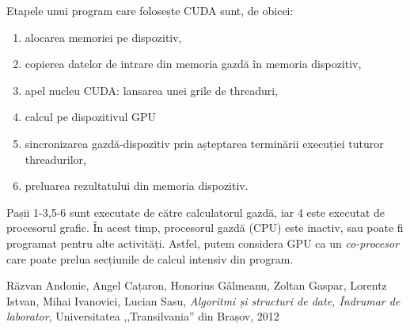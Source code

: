 \documentclass[9pt,a4paper]{article}
\begin{document}
Etapele unui program care folosește CUDA sunt, de obicei:
\begin{enumerate}
    \item alocarea memoriei pe dispozitiv,
    \item copierea datelor de intrare din memoria gazdă în memoria dispozitiv,
    \item apel nucleu CUDA: lansarea unei grile de threaduri,
    \item calcul pe dispozitivul GPU
    \item sincronizarea gazdă-dispozitiv prin așteptarea terminării execuției tuturor threadurilor,
    \item preluarea rezultatului din memoria dispozitiv.
\end{enumerate}

Pașii 1-3,5-6 sunt executate de către calculatorul gazdă, iar 4 este executat de  procesorul grafic. În acest timp, procesorul gazdă (CPU) este inactiv, sau poate fi programat pentru alte activități. Astfel, putem considera GPU ca un \textit{ co-procesor} care poate prelua secțiunile de calcul intensiv din program.

\begin{thebibliography}{99}
    Răzvan Andonie, Angel Cațaron, Honorius Gâlmeanu, Zoltan Gaspar, Lorentz Istvan, Mihai Ivanovici, Lucian Sasu, \textit{Algoritmi și structuri de date, Îndrumar de laborator}, Universitatea ,,Transilvania'' din Brașov, 2012
\end{thebibliography}
\end{document}
